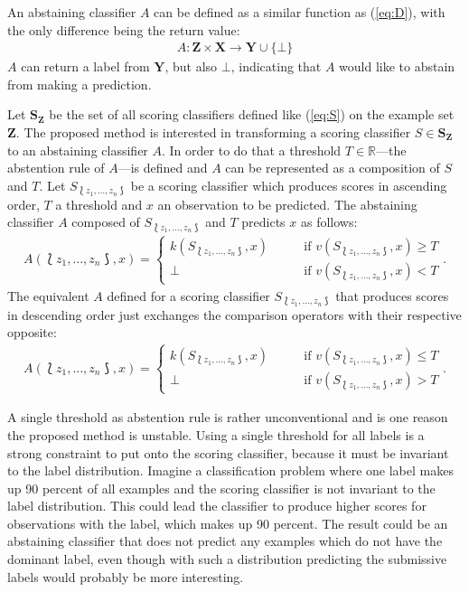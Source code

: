 \documentclass[twoside,11pt]{article}
\def\ds{\Lbag z_1,\dots,z_n \Rbag}
\def\Z{\textbf{Z}}
\def\S{\textbf{S}_{\Z}}
\begin{document}
An abstaining classifier $A$ can be defined as a similar
function as (\ref{eq:D}), with the only difference being
the return value:
\begin{align*}
  A: \textbf{Z} \times \textbf{X} \rightarrow
      \textbf{Y} \cup \{\bot\}
\end{align*}
$A$ can return a label from $\textbf{Y}$, but also $\bot$,
indicating that $A$ would like to abstain from making a
prediction.

Let $\S$ be the set of all scoring classifiers defined like
(\ref{eq:S}) on the example set $\Z$.
The proposed method is interested in transforming a
scoring classifier $S \in \S$ to an abstaining classifier
$A$.
In order to do that a threshold $T \in \mathbb{R}$---the
abstention rule of $A$---is defined and $A$ can be
represented as a composition of $S$ and $T$.
Let $S_{\ds}$ be a scoring classifier which produces scores
in ascending order, $T$ a threshold and $x$ an observation
to be predicted.
The abstaining classifier $A$ composed of $S_{\ds}$ and $T$
predicts $x$ as follows:
\begin{align}
  \label{eq:A}
  A(\ds, x) =
    \begin{cases}
      k(S_{\ds}, x) &\qquad \text{if }v(S_{\ds}, x)\geq T\\
      \bot &\qquad \text{if } v(S_{\ds}, x) < T
    \end{cases}.
\end{align}
The equivalent $A$ defined for a scoring classifier
$S_{\ds}$ that produces scores in descending order just
exchanges the comparison operators with their respective
opposite:
\begin{align}
  \label{eq:A2}
  A(\ds, x) =
    \begin{cases}
      k(S_{\ds}, x) &\qquad \text{if }v(S_{\ds}, x)\leq T\\
      \bot &\qquad \text{if } v(S_{\ds}, x) > T
    \end{cases}.
\end{align}

A single threshold as abstention rule is rather
unconventional and is one reason the proposed method is
unstable.
Using a single threshold for all labels is a strong
constraint to put onto the scoring classifier, because it
must be invariant to the label distribution.
Imagine a classification problem where one label makes up
90 percent of all examples and the scoring classifier is
not invariant to the label distribution.
This could lead the classifier to produce higher scores for
observations with the label, which makes up 90 percent.
The result could be an abstaining classifier that does not
predict any examples which do not have the dominant
label, even though with such a distribution predicting
the submissive labels would probably be more interesting.
\end{document}
